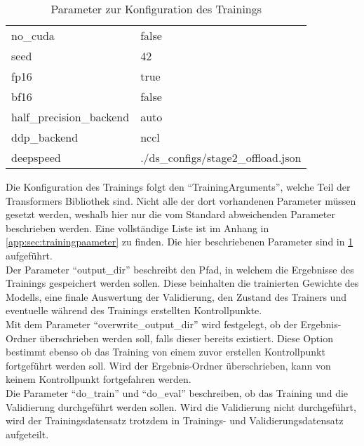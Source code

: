 \begin{table}
\begin{tabular}{ll}
        no\_cuda & false \\
        seed & 42 \\
        fp16 & true \\
        bf16 & false \\
        half\_precision\_backend & auto \\
        ddp\_backend & nccl \\
        deepspeed & ./ds\_configs/stage2\_offload.json \\
        \bottomrule
    \end{tabular}
    \caption{Parameter zur Konfiguration des Trainings}\label{tab:training-config}
\end{table}

Die Konfiguration des Trainings folgt den \enquote{TrainingArguments}, welche Teil der Transformers Bibliothek sind.
Nicht alle der dort vorhandenen Parameter müssen gesetzt werden, weshalb hier nur die vom Standard abweichenden Parameter beschrieben werden.
Eine vollständige Liste ist im Anhang in \cref{app:sec:trainingpaameter} zu finden. Die hier beschriebenen Parameter sind in \cref{tab:training-config} aufgeführt.\\

Der Parameter \enquote{output\_dir} beschreibt den Pfad, in welchem die Ergebnisse des Trainings gespeichert werden sollen.
Diese beinhalten die trainierten Gewichte des Modells, eine finale Auswertung der Validierung, den Zustand des Trainers und eventuelle während des Trainings erstellten Kontrollpunkte.\\

Mit dem Parameter \enquote{overwrite\_output\_dir} wird festgelegt, ob der Ergebnis-Ordner überschrieben werden soll, falls dieser bereits existiert.
Diese Option bestimmt ebenso ob das Training von einem zuvor erstellen Kontrollpunkt fortgeführt werden soll.
Wird der Ergebnis-Ordner überschrieben, kann von keinem Kontrollpunkt fortgefahren werden.\\

Die Parameter \enquote{do\_train} und \enquote{do\_eval} beschreiben, ob das Training und die Validierung durchgeführt werden sollen.
Wird die Validierung nicht durchgeführt, wird der Trainingsdatensatz trotzdem in Trainings- und Validierungsdatensatz aufgeteilt.\\

